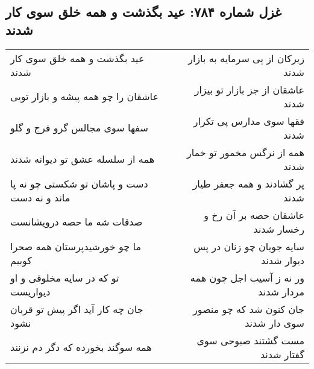 \begin{center}
\section*{غزل شماره ۷۸۴: عید بگذشت و همه خلق سوی کار شدند}
\label{sec:0784}
\begin{longtable}{l p{0.5cm} r}
عید بگذشت و همه خلق سوی کار شدند
&&
زیرکان از پی سرمایه به بازار شدند
\\
عاشقان را چو همه پیشه و بازار تویی
&&
عاشقان از جز بازار تو بیزار شدند
\\
سفها سوی مجالس گرو فرج و گلو
&&
فقها سوی مدارس پی تکرار شدند
\\
همه از سلسله عشق تو دیوانه شدند
&&
همه از نرگس مخمور تو خمار شدند
\\
دست و پاشان تو شکستی چو نه پا ماند و نه دست
&&
پر گشادند و همه جعفر طیار شدند
\\
صدقات شه ما حصه درویشانست
&&
عاشقان حصه بر آن رخ و رخسار شدند
\\
ما چو خورشیدپرستان همه صحرا کوبیم
&&
سایه جویان چو زنان در پس دیوار شدند
\\
تو که در سایه مخلوقی و او دیواریست
&&
ور نه ز آسیب اجل چون همه مردار شدند
\\
جان چه کار آید اگر پیش تو قربان نشود
&&
جان کنون شد که چو منصور سوی دار شدند
\\
همه سوگند بخورده که دگر دم نزنند
&&
مست گشتند صبوحی سوی گفتار شدند
\\
\end{longtable}
\end{center}
